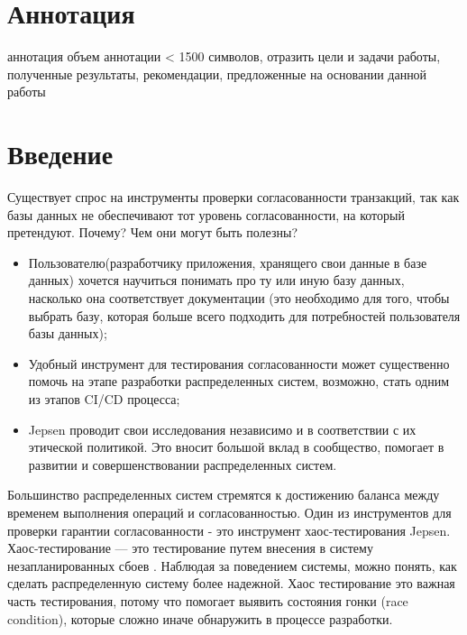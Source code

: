 \documentclass[12pt,  openany]{book}
\begin{document}
\chapter{Аннотация}
\par
аннотация \newline
объем аннотации <  1500 символов,  отразить цели и задачи работы, полученные результаты, рекомендации, предложенные на основании данной работы
\setcounter{page}{2}
\tableofcontents
\clearpage



\chapter{Введение}

Существует спрос на инструменты проверки согласованности транзакций, так  как базы данных не обеспечивают тот уровень согласованности, на который претендуют.  Почему? Чем они могут быть полезны?
\begin{itemize}
\item Пользователю(разработчику приложения, хранящего свои данные в базе данных) хочется научиться понимать про ту или иную базу данных, насколько она соответствует документации (это необходимо для того, чтобы выбрать базу, которая больше всего подходить для потребностей пользователя базы данных);
\item Удобный инструмент для тестирования согласованности может существенно помочь на этапе разработки распределенных систем, возможно, стать одним из этапов CI/CD процесса;
\item Jepsen проводит свои исследования независимо и в соответствии с их этической политикой. Это вносит большой вклад в сообщество, помогает в развитии и совершенствовании распределенных систем.
\end{itemize}
Большинство распределенных систем стремятся к достижению баланса между временем выполнения операций и согласованностью.  Один из инструментов для проверки гарантии согласованности - это инструмент хаос-тестирования Jepsen.  Хаос-тестирование ---  это тестирование путем внесения в систему незапланированных сбоев \cite{chaosTesting}.  Наблюдая за поведением системы, можно понять, как сделать распределенную систему более надежной. Хаос тестирование это важная часть тестирования, потому что помогает выявить состояния гонки (race condition), которые сложно иначе обнаружить в процессе разработки.
\end{document}
